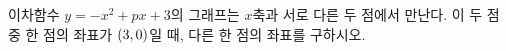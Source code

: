 \hspace*{2mm}\begin{minipage}[t]{\dimexpr\linewidth-2mm\relax}\vspace{0pt}
이차함수 $y=-x^2+px+3$의 그래프는 $x$축과 서로 다른 두 점에서 만난다. 이 두 점 중 한 점의 좌표가 $(3{,}\mkern3mu 0)$일 때, 다른 한 점의 좌표를 구하시오. \end{minipage}
